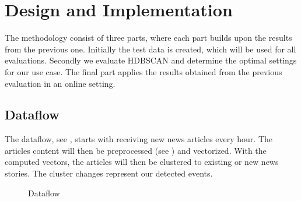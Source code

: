 \section{Design and Implementation}
\label{sec:4_design_and_implementation}

The methodology consist of three parts, where each part builds upon the results from the previous one.
Initially the test data is created, which will be used for all evaluations.
Secondly we evaluate HDBSCAN and determine the optimal settings for our use case.
The final part applies the results obtained from the previous evaluation in an online setting.

\subsection{Dataflow}
\label{subsec:4_dataflow}

The dataflow, see , starts with receiving new news articles every hour.
The articles content will then be preprocessed (see )
and vectorized.
With the computed vectors, the articles will then be clustered to existing or new news stories.
The cluster changes represent our detected events.

\begin{figure}[!htb]
    \centering

    \caption{Dataflow}
    \label{fig:dataflow}
\end{figure}




